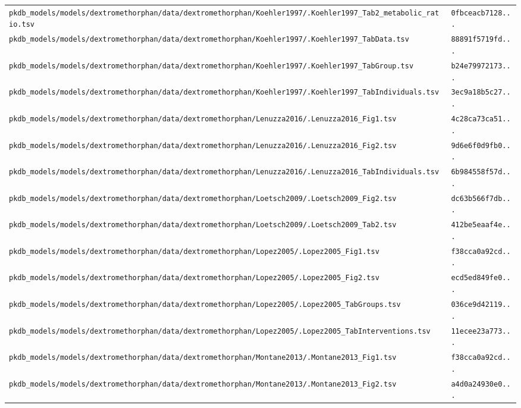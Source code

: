 \begin{longtable}{ll}
\texttt{pkdb\_models/models/dextromethorphan/data/dextromethorphan/Koehler1997/.Koehler1997\_Tab2\_metabolic\_ratio.tsv} & \texttt{0fbceacb7128...} \\
\texttt{pkdb\_models/models/dextromethorphan/data/dextromethorphan/Koehler1997/.Koehler1997\_TabData.tsv} & \texttt{88891f5719fd...} \\
\texttt{pkdb\_models/models/dextromethorphan/data/dextromethorphan/Koehler1997/.Koehler1997\_TabGroup.tsv} & \texttt{b24e79972173...} \\
\texttt{pkdb\_models/models/dextromethorphan/data/dextromethorphan/Koehler1997/.Koehler1997\_TabIndividuals.tsv} & \texttt{3ec9a18b5c27...} \\
\texttt{pkdb\_models/models/dextromethorphan/data/dextromethorphan/Lenuzza2016/.Lenuzza2016\_Fig1.tsv} & \texttt{4c28ca73ca51...} \\
\texttt{pkdb\_models/models/dextromethorphan/data/dextromethorphan/Lenuzza2016/.Lenuzza2016\_Fig2.tsv} & \texttt{9d6e6f0d9fb0...} \\
\texttt{pkdb\_models/models/dextromethorphan/data/dextromethorphan/Lenuzza2016/.Lenuzza2016\_TabIndividuals.tsv} & \texttt{6b984558f57d...} \\
\texttt{pkdb\_models/models/dextromethorphan/data/dextromethorphan/Loetsch2009/.Loetsch2009\_Fig2.tsv} & \texttt{dc63b566f7db...} \\
\texttt{pkdb\_models/models/dextromethorphan/data/dextromethorphan/Loetsch2009/.Loetsch2009\_Tab2.tsv} & \texttt{412be5eaaf4e...} \\
\texttt{pkdb\_models/models/dextromethorphan/data/dextromethorphan/Lopez2005/.Lopez2005\_Fig1.tsv} & \texttt{f38cca0a92cd...} \\
\texttt{pkdb\_models/models/dextromethorphan/data/dextromethorphan/Lopez2005/.Lopez2005\_Fig2.tsv} & \texttt{ecd5ed849fe0...} \\
\texttt{pkdb\_models/models/dextromethorphan/data/dextromethorphan/Lopez2005/.Lopez2005\_TabGroups.tsv} & \texttt{036ce9d42119...} \\
\texttt{pkdb\_models/models/dextromethorphan/data/dextromethorphan/Lopez2005/.Lopez2005\_TabInterventions.tsv} & \texttt{11ecee23a773...} \\
\texttt{pkdb\_models/models/dextromethorphan/data/dextromethorphan/Montane2013/.Montane2013\_Fig1.tsv} & \texttt{f38cca0a92cd...} \\
\texttt{pkdb\_models/models/dextromethorphan/data/dextromethorphan/Montane2013/.Montane2013\_Fig2.tsv} & \texttt{a4d0a24930e0...} \\

\end{longtable}
